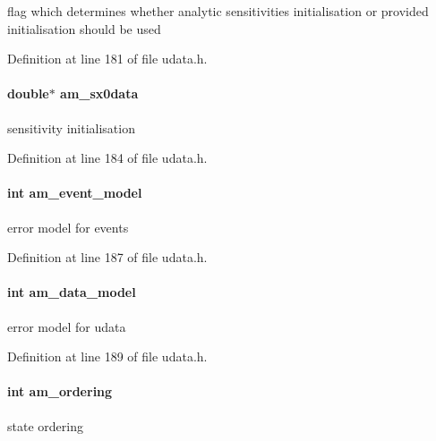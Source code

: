 flag which determines whether analytic sensitivities initialisation or provided initialisation should be used 

Definition at line 181 of file udata.\+h.

\hypertarget{struct_user_data_a7ac27602345668b3a2bcabac4c7af733}{}
\paragraph[{am\+\_\+sx0data}]{\setlength{\rightskip}{0pt plus 5cm}double$\ast$ am\+\_\+sx0data}\label{struct_user_data_a7ac27602345668b3a2bcabac4c7af733}
sensitivity initialisation 

Definition at line 184 of file udata.\+h.

\hypertarget{struct_user_data_ace3cae0f78a3365a5fac7d7daa9928ff}{}
\paragraph[{am\+\_\+event\+\_\+model}]{\setlength{\rightskip}{0pt plus 5cm}int am\+\_\+event\+\_\+model}\label{struct_user_data_ace3cae0f78a3365a5fac7d7daa9928ff}
error model for events 

Definition at line 187 of file udata.\+h.

\hypertarget{struct_user_data_a83373144a2adb9f97cdfca2dfc79ce80}{}
\paragraph[{am\+\_\+data\+\_\+model}]{\setlength{\rightskip}{0pt plus 5cm}int am\+\_\+data\+\_\+model}\label{struct_user_data_a83373144a2adb9f97cdfca2dfc79ce80}
error model for udata 

Definition at line 189 of file udata.\+h.

\hypertarget{struct_user_data_a260a14e35469f1516b194f4f065a9794}{}
\paragraph[{am\+\_\+ordering}]{\setlength{\rightskip}{0pt plus 5cm}int am\+\_\+ordering}\label{struct_user_data_a260a14e35469f1516b194f4f065a9794}
state ordering 

